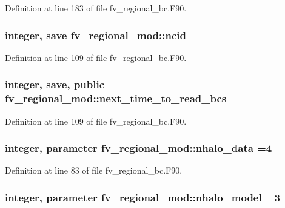 Definition at line 183 of file fv\-\_\-regional\-\_\-bc.\-F90.

\subsubsection[{ncid}]{\setlength{\rightskip}{0pt plus 5cm}integer, save fv\-\_\-regional\-\_\-mod\-::ncid\hspace{0.3cm}{\ttfamily [private]}}\label{classfv__regional__mod_a4d4fa505ef6e59899c62c7e52d14fefc}


Definition at line 109 of file fv\-\_\-regional\-\_\-bc.\-F90.

\subsubsection[{next\-\_\-time\-\_\-to\-\_\-read\-\_\-bcs}]{\setlength{\rightskip}{0pt plus 5cm}integer, save, public fv\-\_\-regional\-\_\-mod\-::next\-\_\-time\-\_\-to\-\_\-read\-\_\-bcs}\label{classfv__regional__mod_a295cbf8a004fa34e95f2cca9358e0132}


Definition at line 109 of file fv\-\_\-regional\-\_\-bc.\-F90.

\subsubsection[{nhalo\-\_\-data}]{\setlength{\rightskip}{0pt plus 5cm}integer, parameter fv\-\_\-regional\-\_\-mod\-::nhalo\-\_\-data =4\hspace{0.3cm}{\ttfamily [private]}}\label{classfv__regional__mod_ace154d36bee6c72b51943cfb94b9de9a}


Definition at line 83 of file fv\-\_\-regional\-\_\-bc.\-F90.

\subsubsection[{nhalo\-\_\-model}]{\setlength{\rightskip}{0pt plus 5cm}integer, parameter fv\-\_\-regional\-\_\-mod\-::nhalo\-\_\-model =3\hspace{0.3cm}{\ttfamily [private]}}\label{classfv__regional__mod_aa41184f5720c2bb3148d0ee0e18c1eff}


